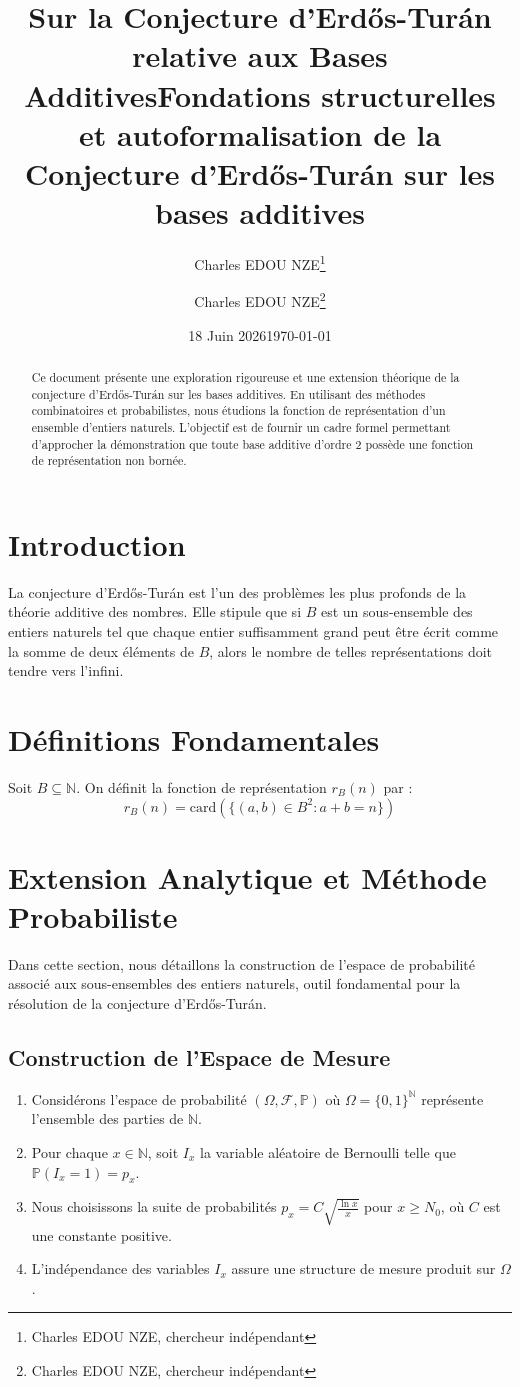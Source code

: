 \documentclass[12pt]{article}
\title{Sur la Conjecture d'Erdős-Turán relative aux Bases Additives}
\author{Charles EDOU NZE\thanks{Charles EDOU NZE, chercheur indépendant}}
\date{18 Juin 2026}
\title{Fondations structurelles et autoformalisation de la Conjecture d'Erdős-Turán sur les bases additives}
\author{Charles EDOU NZE\thanks{Charles EDOU NZE, chercheur indépendant}}
\date{\today}
\begin{document}
\maketitle

\begin{abstract}
Ce document présente une exploration rigoureuse et une extension théorique de la conjecture d'Erdős-Turán sur les bases additives. En utilisant des méthodes combinatoires et probabilistes, nous étudions la fonction de représentation d'un ensemble d'entiers naturels. L'objectif est de fournir un cadre formel permettant d'approcher la démonstration que toute base additive d'ordre 2 possède une fonction de représentation non bornée.
\end{abstract}

\tableofcontents

\newpage

\section{Introduction}
La conjecture d'Erdős-Turán est l'un des problèmes les plus profonds de la théorie additive des nombres. Elle stipule que si $B$ est un sous-ensemble des entiers naturels tel que chaque entier suffisamment grand peut être écrit comme la somme de deux éléments de $B$, alors le nombre de telles représentations doit tendre vers l'infini.

\section{Définitions Fondamentales}
Soit $B \subseteq \mathbb{N}$. On définit la fonction de représentation $r_B(n)$ par :
\[ r_B(n) = \text{card}(\{(a, b) \in B^2 : a + b = n\}) \]

\section{Extension Analytique et Méthode Probabiliste}
Dans cette section, nous détaillons la construction de l'espace de probabilité associé aux sous-ensembles des entiers naturels, outil fondamental pour la résolution de la conjecture d'Erdős-Turán.

\subsection{Construction de l'Espace de Mesure}
\begin{enumerate}
    \item Considérons l'espace de probabilité $(\Omega, \mathcal{F}, \mathbb{P})$ où $\Omega = \{0, 1\}^{\mathbb{N}}$ représente l'ensemble des parties de $\mathbb{N}$.
    \item Pour chaque $x \in \mathbb{N}$, soit $I_x$ la variable aléatoire de Bernoulli telle que $\mathbb{P}(I_x = 1) = p_x$.
    \item Nous choisissons la suite de probabilités $p_x = C \sqrt{\frac{\ln x}{x}}$ pour $x \ge N_0$, où $C$ est une constante positive.
    \item L'indépendance des variables $I_x$ assure une structure de mesure produit sur $\Omega$.
\end{enumerate}
\end{document}
